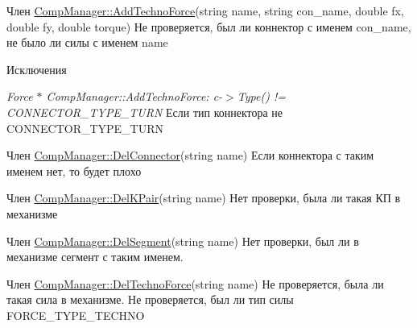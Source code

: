 \label{bug__bug000013}
\hypertarget{bug__bug000013}{}
 
\begin{DoxyDescription}
\item[Член \hyperlink{class_comp_manager_ae0d3f85a00d2413d78a7379592515266}{CompManager::AddTechnoForce}(string name, string con\_\-name, double fx, double fy, double torque) ]Не проверяется, был ли коннектор с именем con\_\-name, не было ли силы с именем name 
\begin{DoxyExceptions}{Исключения}
\item[{\em Force $\ast$ CompManager::AddTechnoForce: c-\/$>$Type() != CONNECTOR\_\-TYPE\_\-TURN}]Если тип коннектора не CONNECTOR\_\-TYPE\_\-TURN \end{DoxyExceptions}

\end{DoxyDescription}

\label{bug__bug000012}
\hypertarget{bug__bug000012}{}
 
\begin{DoxyDescription}
\item[Член \hyperlink{class_comp_manager_a94587a431d85adb01d8cf016f115f32a}{CompManager::DelConnector}(string name) ]Если коннектора с таким именем нет, то будет плохо 
\end{DoxyDescription}

\label{bug__bug000008}
\hypertarget{bug__bug000008}{}
 
\begin{DoxyDescription}
\item[Член \hyperlink{class_comp_manager_acf9a726c050661051e19eca9b6a7d51d}{CompManager::DelKPair}(string name) ]Нет проверки, была ли такая КП в механизме 
\end{DoxyDescription}

\label{bug__bug000003}
\hypertarget{bug__bug000003}{}
 
\begin{DoxyDescription}
\item[Член \hyperlink{class_comp_manager_ab8b0643ca8728557894ab34f47e47ae9}{CompManager::DelSegment}(string name) ]Нет проверки, был ли в механизме сегмент с таким именем. 
\end{DoxyDescription}

\label{bug__bug000015}
\hypertarget{bug__bug000015}{}
 
\begin{DoxyDescription}
\item[Член \hyperlink{class_comp_manager_a9029ca9d910c0a768cde3ba354d8b2cc}{CompManager::DelTechnoForce}(string name) ]Не проверяется, была ли такая сила в механизме. Не проверяется, был ли тип силы FORCE\_\-TYPE\_\-TECHNO 
\end{DoxyDescription}

